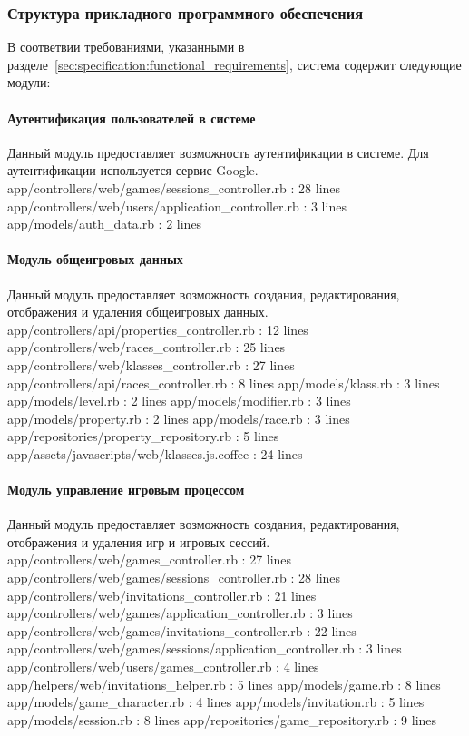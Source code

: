 \subsubsection{Структура прикладного программного обеспечения}

В соответвии требованиями, указанными в разделе~\ref{sec:specification:functional_requirements}, система содержит следующие модули:
\paragraph{Аутентификация пользователей в системе}

Данный модуль предоставляет возможность аутентификации в системе. Для аутентификации используется сервис Google.
app/controllers/web/games/sessions\_controller.rb : 28 lines
app/controllers/web/users/application\_controller.rb : 3 lines
app/models/auth\_data.rb : 2 lines


\paragraph{Модуль общеигровых данных}

Данный модуль предоставляет возможность создания, редактирования, отображения и удаления общеигровых данных.
app/controllers/api/properties\_controller.rb : 12 lines
app/controllers/web/races\_controller.rb : 25 lines
app/controllers/web/klasses\_controller.rb : 27 lines
app/controllers/api/races\_controller.rb : 8 lines
app/models/klass.rb : 3 lines
app/models/level.rb : 2 lines
app/models/modifier.rb : 3 lines
app/models/property.rb : 2 lines
app/models/race.rb : 3 lines
app/repositories/property\_repository.rb : 5 lines
app/assets/javascripts/web/klasses.js.coffee : 24 lines


\paragraph{Модуль управление игровым процессом}

Данный модуль предоставляет возможность создания, редактирования, отображения и удаления игр и игровых сессий.
app/controllers/web/games\_controller.rb : 27 lines
app/controllers/web/games/sessions\_controller.rb : 28 lines
app/controllers/web/invitations\_controller.rb : 21 lines
app/controllers/web/games/application\_controller.rb : 3 lines
app/controllers/web/games/invitations\_controller.rb : 22 lines
app/controllers/web/games/sessions/application\_controller.rb : 3 lines
app/controllers/web/users/games\_controller.rb : 4 lines
app/helpers/web/invitations\_helper.rb : 5 lines
app/models/game.rb : 8 lines
app/models/game\_character.rb : 4 lines
app/models/invitation.rb : 5 lines
app/models/session.rb : 8 lines
app/repositories/game\_repository.rb : 9 lines

